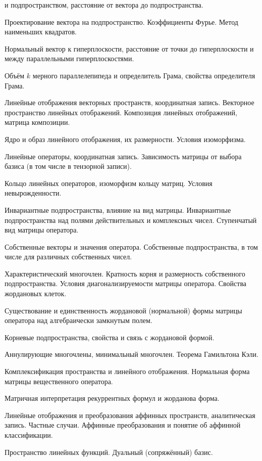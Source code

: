 \documentclass[a4paper]{article}
\begin{document}
\begin{nums}{-2}
и подпространством, расстояние от вектора до подпространства.
\item Проектирование вектора на подпространство. Коэффициенты Фурье. Метод наименьших квадратов.
\item Нормальный вектор к гиперплоскости, расстояние от точки до гиперплоскости и
между параллельными гиперплоскостями.
\item Объём $k$ мерного параллелепипеда и определитель Грама, свойства определителя Грама.
\item Линейные отображения векторных пространств, координатная запись. Векторное пространство линейных отображений.
Композиция линейных отображений, матрица композиции.
\item Ядро и образ линейного отображения, их размерности. Условия изоморфизма.
\item Линейные операторы, координатная запись. Зависимость матрицы от выбора базиса
(в том числе в тензорной записи).
\item Кольцо линейных операторов, изоморфизм кольцу матриц. Условия невырожденности.
\item Инвариантные подпространства, влияние на вид матрицы. Инвариантные подпространства над полями действительных и
комплексных чисел. Ступенчатый вид матрицы оператора.
\item Собственные векторы и значения оператора. Собственные подпространства, в том числе для различных
собственных чисел.
\item Характеристический многочлен. Кратность корня и размерность собственного подпространства.
Условия диагонализируемости матрицы оператора. Свойства жордановых клеток.
\item Существование и единственность жордановой (нормальной) формы матрицы
оператора над алгебраически замкнутым полем.
\item Корневые подпространства, свойства и связь с жордановой формой.
\item Аннулирующие многочлены, минимальный многочлен. Теорема Гамильтона Кэли.
\item Комплексификация пространства и линейного отображения. Нормальная форма матрицы
вещественного оператора.
\item Матричная интерпретация рекуррентных формул и жорданова форма.
\item Линейные отображения и преобразования аффинных пространств, аналитическая запись.
Частные случаи. Аффинные преобразования и понятие об аффинной классификации.
\item Пространство линейных функций. Дуальный (сопряжённый) базис.

\end{nums}
\end{document}
